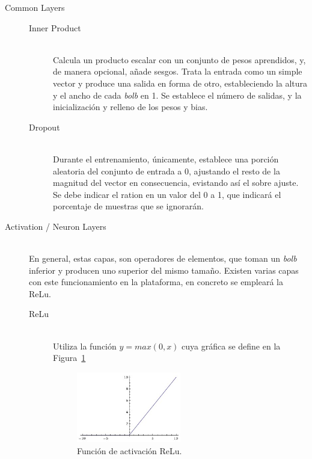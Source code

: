 \begin{description}
\vspace{70pt}
\item[Common Layers] \hfill
	\begin{description}
	\item[Inner Product] \hfill 
	\vspace{5pt}
	\\
	Calcula un producto escalar con un conjunto de pesos aprendidos, y, de manera opcional, añade sesgos. Trata la entrada como un simple vector y produce una salida en forma de otro, estableciendo la altura y el ancho de cada \textit{bolb} en 1. Se establece el número de salidas, y la inicialización y relleno de los pesos y bias.
	\vspace{10pt}
	\item[Dropout] \hfill 
	\vspace{5pt}
	\\
	Durante el entrenamiento, únicamente, establece una porción aleatoria del conjunto de entrada a 0, ajustando el resto de la magnitud del vector en consecuencia, evistando así el sobre ajuste. Se debe indicar el ration en un valor del 0 a 1, que indicará el porcentaje de muestras que se ignorarán.
	\end{description}

\vspace{15pt}	
\item[Activation / Neuron Layers] \hfill  
\vspace{10pt}
\\
	En general, estas capas, son operadores de elementos, que toman un \textit{bolb} inferior y producen uno superior del mismo tamaño. Existen varias capas con este funcionamiento en la plataforma, en concreto se empleará la ReLu.
	\vspace{10pt}
	\begin{description}
	\item[ReLu] \hfill  
	\vspace{5pt}
	\\
		Utiliza la función $y=max(0,x)$ cuya gráfica se define en la Figura~\ref{fig.reLu}
		\begin{figure}[H]
			\begin{center}
				\includegraphics[width=0.5\textwidth]{figures/relu.jpeg}
				\caption{Función de activación ReLu.}
				\label{fig.reLu}
			\end{center}
		\end{figure} 
	\end{description}
	

\end{description}
